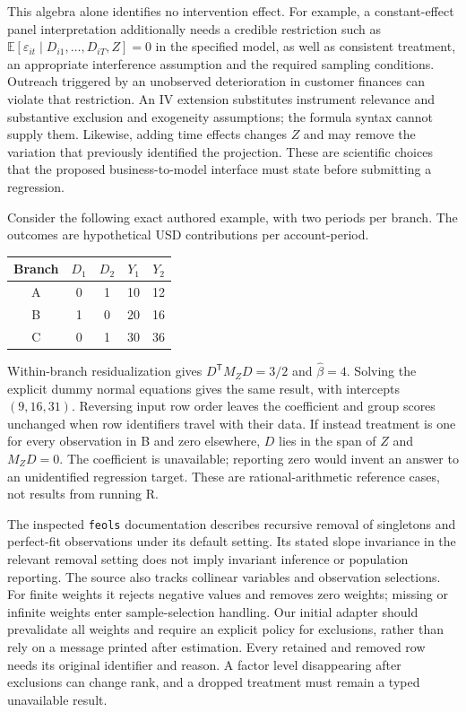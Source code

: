 This algebra alone identifies no intervention effect. For example, a
constant-effect panel interpretation additionally needs a credible restriction
such as $\mathbb E[\varepsilon_{it}\mid D_{i1},\ldots,D_{iT},Z]=0$ in the
specified model, as well as consistent treatment, an appropriate interference
assumption and the required sampling conditions. Outreach triggered by an
unobserved deterioration in customer finances can violate that restriction.
An IV extension substitutes instrument relevance and substantive exclusion
and exogeneity assumptions; the formula syntax cannot supply them. Likewise,
adding time effects changes $Z$ and may remove the variation that previously
identified the projection. These are scientific choices that the proposed
business-to-model interface must state before submitting a regression.

Consider the following exact authored example, with two periods per branch.
The outcomes are hypothetical USD contributions per account-period.
\begin{center}
\begin{tabular}{c|cc|cc}
Branch & $D_1$ & $D_2$ & $Y_1$ & $Y_2$\\\hline
A & 0 & 1 & 10 & 12\\
B & 1 & 0 & 20 & 16\\
C & 0 & 1 & 30 & 36
\end{tabular}
\end{center}
Within-branch residualization gives $D^{\mathsf T}M_ZD=3/2$ and
$\widehat\beta=4$. Solving the explicit dummy normal equations gives the
same result, with intercepts $(9,16,31)$. Reversing input row order leaves
the coefficient and group scores unchanged when row identifiers travel with
their data. If instead treatment is one for every observation in B and zero
elsewhere, $D$ lies in the span of $Z$ and $M_ZD=0$. The coefficient is
unavailable; reporting zero would invent an answer to an unidentified
regression target. These are rational-arithmetic reference cases,
not results from running R.~\citep{exec20_fixest_reference}

The inspected \texttt{feols} documentation describes recursive removal of
singletons and perfect-fit observations under its default setting. Its stated
slope invariance in the relevant removal setting does not imply invariant
inference or population reporting. The source also tracks collinear variables
and observation selections. For finite weights it rejects negative values
and removes zero weights; missing or infinite weights enter sample-selection
handling. Our initial adapter should prevalidate all weights and require an
explicit policy for exclusions, rather than rely on a message printed after
estimation. Every retained and removed row needs its original identifier and
reason. A factor level disappearing after exclusions can change rank, and a
dropped treatment must remain a typed unavailable result.~\citep{exec20_fixest_source}

